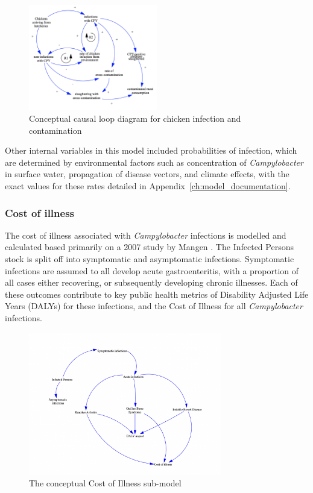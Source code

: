 \begin{figure}[h!]
\centering
\includegraphics[width=0.50\textwidth]{images/Transmission submodel.png}
\caption{Conceptual causal loop diagram for chicken infection and contamination}
\label{fig:transmission_submodel}
\end{figure}

Other internal variables in this model included probabilities of infection, which are determined by environmental factors such as concentration of \textit{Campylobacter} in surface water, propagation of disease vectors, and climate effects, with the exact values for these rates detailed in Appendix~\ref{ch:model_documentation}.


\subsubsection*{Cost of illness}

The cost of illness associated with \textit{Campylobacter} infections is modelled and calculated based primarily on a 2007 study by Mangen \parencite{mangen_campylobacteriosis_2007}. The Infected Persons stock is split off into symptomatic and asymptomatic infections. Symptomatic infections are assumed to all develop acute gastroenteritis, with a proportion of all cases either recovering, or subsequently developing chronic illnesses. Each of these outcomes contribute to key public health metrics of Disability Adjusted Life Years (DALYs) for these infections, and the Cost of Illness for all \textit{Campylobacter} infections. 

\begin{figure}[h]
\centering
\includegraphics[width=0.75\textwidth]{images/COI_submodel.png}
\caption{The conceptual Cost of Illness sub-model}
\end{figure}

